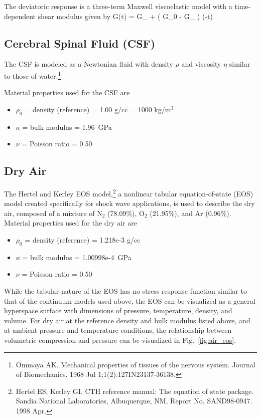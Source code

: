 \documentclass[12pt,reqno]{amsart}
\begin{document}
The deviatoric response is a three-term Maxwell viscoelastic model with
a time-dependent shear modulus given by
\be
  G(t) = G_{\infty} + ( G_0 - G_{\infty} ) \exp(-\beta t)
\ee

\subsection{Cerebral Spinal Fluid (CSF)}
The CSF is modeled as a Newtonian fluid with density $\rho$ and
viscosity $\eta$ similar to those of water.\footnote{Ommaya AK. 
Mechanical properties of tissues of the nervous system. 
Journal of Biomechanics. 1968 Jul 1;1(2):127IN23137-36138.}


Material properties used for the CSF are
\begin{itemize}
  \item $\rho_0$ = density (reference) = 1.00 g/cc = 1000 kg/m$^3$
  \item $\kappa$ = bulk modulus = 1.96~GPa 
  \item $\nu$ = Poisson ratio = 0.50
\end{itemize}


\subsection{Dry Air}
The Hertel and Kerley EOS model,\footnote{Hertel ES, Kerley GI. 
CTH reference manual: The equation of state package. 
Sandia National Laboratories, Albuquerque, NM, 
Report No. SAND98-0947. 1998 Apr.} a nonlinear tabular equation-of-state (EOS)
model created specifically for shock wave applications, is used to
describe the dry air, composed of a mixture of N$_2$ (78.09\%), 
O$_2$ (21.95\%), and Ar (0.96\%).  
Material properties used for the dry air are
\begin{itemize}
  \item $\rho_0$ = density (reference) = 1.218e-3 g/cc
  \item $\kappa$ = bulk modulus = 1.00998e-4~GPa 
  \item $\nu$ = Poisson ratio = 0.50
\end{itemize}
While the tabular nature of the EOS has no stress response function
similar to that of the continuum models used above, the EOS can be 
visualized as a general hyperspace surface with dimensions of 
pressure, temperature, density, and volume.  For dry air at the 
reference density and bulk modulus listed above, and at ambient 
pressure and temperature conditions, the relationship between volumetric
compression and pressure can be visualized in Fig.~\ref{fig:air_eos}.
\end{document}
